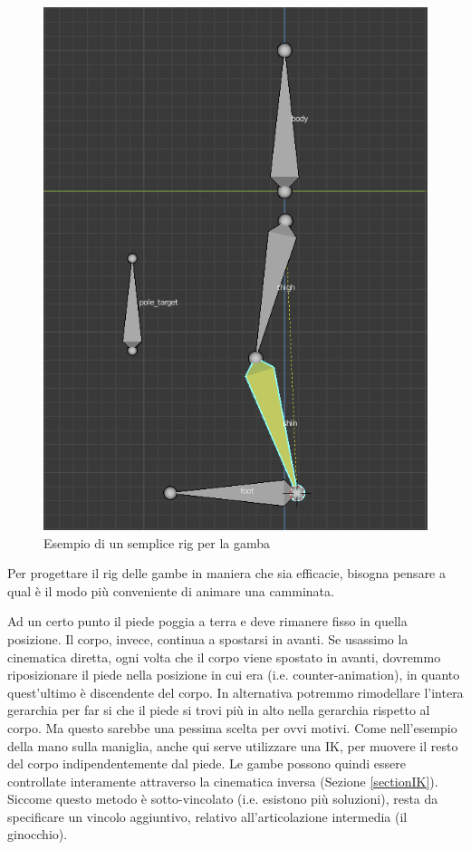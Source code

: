 \begin{figure}
\centering
\includegraphics[width=.8\textwidth]{Figures/leg}
\decoRule
\caption[Rig gamba]{Esempio di un semplice rig per la gamba}
\label{fig:leg}
\end{figure}

Per progettare il rig delle gambe in maniera che sia efficacie, bisogna pensare a qual è il modo più conveniente di animare una camminata.

Ad un certo punto il piede poggia a terra e deve rimanere fisso in quella posizione. Il corpo, invece, continua a spostarsi in avanti.
Se usassimo la cinematica diretta, ogni volta che il corpo viene spostato in avanti, dovremmo riposizionare il piede nella posizione in cui era (i.e. counter-animation), in quanto quest'ultimo è discendente del corpo.
In alternativa potremmo rimodellare l'intera gerarchia per far si che il piede si trovi più in alto nella gerarchia rispetto al corpo. Ma questo sarebbe una pessima scelta per ovvi motivi.
Come nell'esempio della mano sulla maniglia, anche qui serve utilizzare una IK, per muovere il resto del corpo indipendentemente dal piede.
Le gambe possono quindi essere controllate interamente attraverso la cinematica inversa (Sezione \ref{sectionIK}).
Siccome questo metodo è sotto-vincolato (i.e. esistono più soluzioni), resta da specificare un vincolo aggiuntivo, relativo all'articolazione intermedia (il ginocchio).

